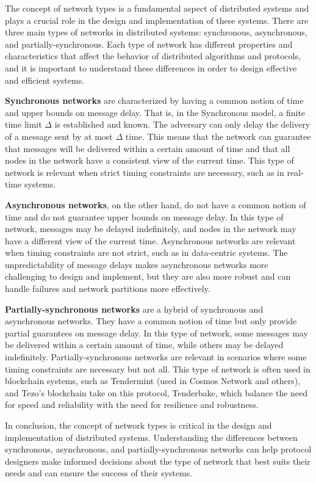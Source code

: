 The concept of network types is a fundamental aspect of distributed systems and plays a crucial role in the design and implementation of these systems. There are three main types of networks in distributed systems: synchronous, asynchronous, and partially-synchronous. Each type of network has different properties and characteristics that affect the behavior of distributed algorithms and protocols, and it is important to understand these differences in order to design effective and efficient systems.

\textbf{Synchronous networks} are characterized by having a common notion of time and upper bounds on message delay. 
That is, in the Synchronous model, a finite time limit $\Delta$ is established and known. The adversary can only delay the delivery of a message sent by at most $\Delta$ time.
This means that the network can guarantee that messages will be delivered within a certain amount of time and that all nodes in the network have a consistent view of the current time. This type of network is relevant when strict timing constraints are necessary, such as in real-time systems.

\textbf{Asynchronous networks}, on the other hand, do not have a common notion of time and do not guarantee upper bounds on message delay. 
In this type of network, messages may be delayed indefinitely, and nodes in the network may have a different view of the current time. Asynchronous networks are relevant when timing constraints are not strict, such as in data-centric systems. The unpredictability of message delays makes asynchronous networks more challenging to design and implement, but they are also more robust and can handle failures and network partitions more effectively.

\textbf{Partially-synchronous networks} are a hybrid of synchronous and asynchronous networks.
They have a common notion of time but only provide partial guarantees on message delay. In this type of network, some messages may be delivered within a certain amount of time, while others may be delayed indefinitely. Partially-synchronous networks are relevant in scenarios where some timing constraints are necessary but not all. This type of network is often used in blockchain systems, such as Tendermint (used in Cosmos Network and others), and Tezo's blockchain take on this protocol, Tenderbake, which balance the need for speed and reliability with the need for resilience and robustness.

In conclusion, the concept of network types is critical in the design and implementation of distributed systems. Understanding the differences between synchronous, asynchronous, and partially-synchronous networks can help protocol designers make informed decisions about the type of network that best suits their needs and can ensure the success of their systems.

